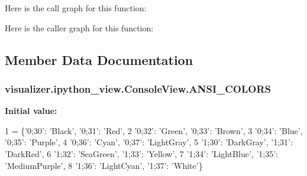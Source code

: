 Here is the call graph for this function\+:




Here is the caller graph for this function\+:




\subsection{Member Data Documentation}
\subsubsection[{\texorpdfstring{A\+N\+S\+I\+\_\+\+C\+O\+L\+O\+RS}{ANSI_COLORS}}]{\setlength{\rightskip}{0pt plus 5cm}visualizer.\+ipython\+\_\+view.\+Console\+View.\+A\+N\+S\+I\+\_\+\+C\+O\+L\+O\+RS\hspace{0.3cm}{\ttfamily [static]}}\hypertarget{classvisualizer_1_1ipython__view_1_1ConsoleView_a48b8c29be2e81f0e3c66d91bfc2f4edf}{}\label{classvisualizer_1_1ipython__view_1_1ConsoleView_a48b8c29be2e81f0e3c66d91bfc2f4edf}
{\bfseries Initial value\+:}
\begin{DoxyCode}
1 = \{\textcolor{stringliteral}{'0;30'}: \textcolor{stringliteral}{'Black'},     \textcolor{stringliteral}{'0;31'}: \textcolor{stringliteral}{'Red'},
2                   \textcolor{stringliteral}{'0;32'}: \textcolor{stringliteral}{'Green'},     \textcolor{stringliteral}{'0;33'}: \textcolor{stringliteral}{'Brown'},
3                   \textcolor{stringliteral}{'0;34'}: \textcolor{stringliteral}{'Blue'},      \textcolor{stringliteral}{'0;35'}: \textcolor{stringliteral}{'Purple'},
4                   \textcolor{stringliteral}{'0;36'}: \textcolor{stringliteral}{'Cyan'},      \textcolor{stringliteral}{'0;37'}: \textcolor{stringliteral}{'LightGray'},
5                   \textcolor{stringliteral}{'1;30'}: \textcolor{stringliteral}{'DarkGray'},  \textcolor{stringliteral}{'1;31'}: \textcolor{stringliteral}{'DarkRed'},
6                   \textcolor{stringliteral}{'1;32'}: \textcolor{stringliteral}{'SeaGreen'},  \textcolor{stringliteral}{'1;33'}: \textcolor{stringliteral}{'Yellow'},
7                   \textcolor{stringliteral}{'1;34'}: \textcolor{stringliteral}{'LightBlue'}, \textcolor{stringliteral}{'1;35'}: \textcolor{stringliteral}{'MediumPurple'},
8                   \textcolor{stringliteral}{'1;36'}: \textcolor{stringliteral}{'LightCyan'}, \textcolor{stringliteral}{'1;37'}: \textcolor{stringliteral}{'White'}\}
\end{DoxyCode}


